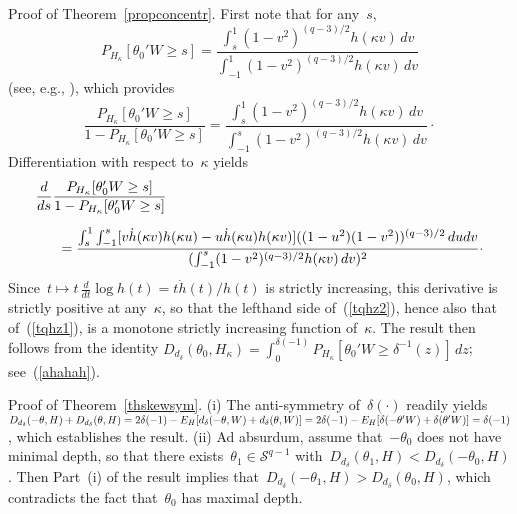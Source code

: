\documentclass[usenames,dvipsnames]{article}
\begin{document}

Proof of Theorem~\ref{propconcentr}.
First note that for any~$s$, 
\begin{equation}
	\label{tqhz1}
P_{H_\kappa}[\theta_0'W\geq s]
=
\frac{ 
\int_{s}^1
(1-v^2)^{(q-3)/2}
h(\kappa v) 
\,
dv
}
{\int_{-1}^1
(1-v^2)^{(q-3)/2}
h(\kappa v) 
\,
dv
}
\end{equation}
(see, e.g., \citealp{PaiVer17b}), which provides
\begin{equation}
	\label{tqhz2}
\frac{P_{H_\kappa}[\theta_0'W\geq s]}{1-P_{H_\kappa}[\theta_0'W\geq s]}
=
\frac{ 
\int_{s}^1
(1-v^2)^{(q-3)/2}
h(\kappa v) 
\,
dv
}
{\int_{-1}^s
(1-v^2)^{(q-3)/2}
h(\kappa v) 
\,
dv
}
\cdot
\end{equation}
Differentiation with respect to~$\kappa$ yields
\begin{eqnarray*}
\lefteqn{
\frac{d}{ds}
\frac{P_{H_\kappa}[\theta_0'W\geq s]}{1-P_{H_\kappa}[\theta_0'W\geq s]}
}
\\[2mm]
& & 
\hspace{3mm} 
=
\frac{ 
\int_{s}^1
\int_{-1}^s
[
v
\dot h(\kappa v) 
h(\kappa u) 
-
u
\dot h(\kappa u) 
h(\kappa v) 
]
((1-u^2)(1-v^2))^{(q-3)/2}
\,
du
dv
}
{
(
\int_{-1}^s
(1-v^2)^{(q-3)/2}
h(\kappa v) 
\,
dv
)^2
}
\cdot
\end{eqnarray*}
Since~$t \mapsto t\,\frac{d}{dt}\log h(t)=t \dot{h}(t)/h(t)$ is strictly increasing, this derivative is strictly positive at any~$\kappa$, so that the lefthand side of~(\ref{tqhz2}), hence also that of~(\ref{tqhz1}),  is a monotone strictly increasing function of~$\kappa$. The result then follows from the identity
$
D_{d_{\delta}}(\theta_0, H_\kappa)
=
\int_{0}^{\delta(-1)} P_{H_\kappa}[ \theta_0'W \geq \delta^{-1}(z)] \,dz
$;
see~(\ref{ahahah}). %
\cqfd
\vspace{3mm}


Proof of Theorem~\ref{thskewsym}.
(i) The anti-symmetry of~$\delta(\cdot)$ readily yields
$
D_{d_{\delta}}(-\theta, H) 
+
D_{d_{\delta}}(\theta, H) 
=
2 \delta(-1) - E_{H}[d_\delta(-\theta,W)+d_\delta(\theta,W)]
=
2 \delta(-1) - E_{H}[\delta(-\theta' W)+\delta(\theta' W)]
\linebreak
=
\delta(-1) 
$,	
which establishes the result. (ii) Ad absurdum, assume that~$-\theta_0$ does not have minimal depth, so that there exists~$\theta_1\in\mathcal{S}^{q-1}$ with~$D_{d_{\delta}}(\theta_1, H)<D_{d_{\delta}}(-\theta_0, H)$. Then Part~(i) of the result implies that~$D_{d_{\delta}}(-\theta_1, H)>D_{d_{\delta}}(\theta_0, H)$, which contradicts the fact that~$\theta_0$ has maximal depth.
\cqfd
\vspace{3mm}
\end{document}
